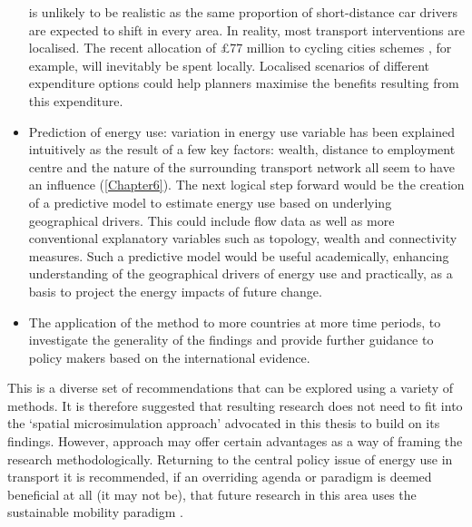 \documentclass[a4paper, 11pt, twoside]{Thesis}
\begin{document}
\begin{itemize}
is unlikely to be realistic as the same proportion of short-distance car
drivers are expected to shift in every area. In reality, most transport
interventions are localised. The recent allocation of \pounds 77 million to
cycling cities schemes \citep{BBc2013-cycling}, for example, will inevitably be
spent locally. Localised scenarios of different expenditure options could help
planners maximise the benefits resulting from this expenditure.
\item Prediction of energy use: variation in energy use variable has been
explained intuitively as the result of a few key factors: wealth, distance to
employment centre and the nature of the surrounding transport network all seem
to have an influence (\cref{Chapter6}). The next logical step forward would
be the creation of a predictive model to estimate energy use based on
underlying geographical drivers. This could include flow data
\citep{Simini2012} as well as more conventional explanatory variables such as
topology, wealth and connectivity measures. Such a predictive model would be
useful academically, enhancing understanding of the geographical drivers of
energy use \citep{Steemers2003} and practically, as a basis to project the
energy impacts of future change.
\item The application of the method to more countries at more time periods, to
investigate the generality of the findings and provide further guidance to
policy makers based on the international evidence.
\end{itemize}
This is a diverse set of recommendations that can be explored using a variety
of methods. It is therefore suggested that resulting research does not 
need to fit into the `spatial microsimulation approach' advocated
in this thesis to build on its findings. However, approach
may offer certain advantages as a way of framing the research methodologically.
Returning to the central policy issue of energy use in transport
it is recommended, if an overriding agenda or
paradigm is deemed beneficial at all (it may not be), that future research
in this area uses the sustainable mobility paradigm \citet{Banister2008}.
\end{document}
